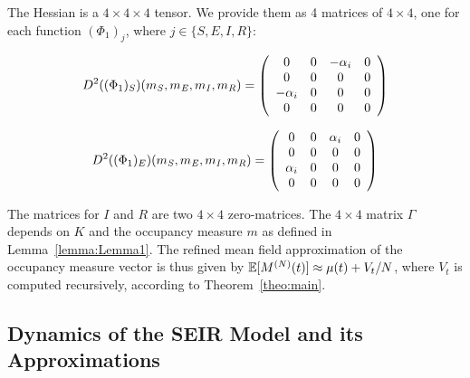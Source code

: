 \documentclass{elsarticle}
\begin{document}
The Hessian is a $4 \times 4 \times 4$ tensor. We provide them as 4 matrices of $4 \times 4$, one for each function $(\Phi_1)_j$, where $j \in \{S,E,I,R\}$:

$$D^2((\Phi_1)_S)(m_{\mathit{S}}, m_{\mathit{E}},m_{\mathit{I}},m_{\mathit{R}})
= \left(
    \begin{array}{cccc}
      0 &  0& -\alpha_i & 0  \\
      0 & 0 & 0 & 0 \\
      -\alpha_i & 0 & 0 & 0 \\
      0 & 0 & 0 & 0 \\
    \end{array}
  \right)$$
  
$$D^2((\Phi_1)_E)(m_{\mathit{S}}, m_{\mathit{E}},m_{\mathit{I}},m_{\mathit{R}})
= \left(
    \begin{array}{cccc}
      0 &  0& \alpha_i & 0  \\
      0 & 0 & 0 & 0 \\
      \alpha_i & 0 & 0 & 0 \\
      0 & 0 & 0 & 0 \\
    \end{array}
  \right)$$
  
The matrices for $I$ and $R$ are two $4 \times 4$ zero-matrices.
%
The $4 \times 4$ matrix $\Gamma$ depends on $K$ and the occupancy measure $m$ as defined in Lemma~\ref{lemma:Lemma1}.
%
The refined mean field approximation of the occupancy measure vector is thus given by 
$\mathbb{E}[M^{(N)}(t)] \approx \mu(t) + V_t/N$, where $V_t$ is computed recursively, according to Theorem~\ref{theo:main}.

\subsection{Dynamics of the SEIR Model and its Approximations}
\end{document}
